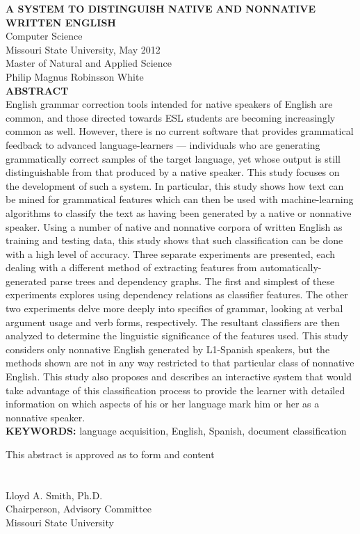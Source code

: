 \documentclass[main.tex]{subfiles}
\begin{document}
\noindent\textbf{A SYSTEM TO DISTINGUISH NATIVE AND NONNATIVE WRITTEN ENGLISH}\\
\noindent Computer Science\\
\noindent Missouri State University, May 2012\\
\noindent Master of Natural and Applied Science\\
\noindent Philip Magnus Robinsson White\\
\null
\noindent\textbf{ABSTRACT}\\
\singlespacing
\noindent English grammar correction tools intended for native speakers of English are common, and those directed towards ESL students are becoming increasingly common as well. However, there is no current software that provides grammatical feedback to advanced language-learners --- individuals who are generating grammatically correct samples of the target language, yet whose output is still distinguishable from that produced by a native speaker. This study focuses on the development of such a system. In particular, this study shows how text can be mined for grammatical features which can then be used with machine-learning algorithms to classify the text as having been generated by a native or nonnative speaker. Using a number of native and nonnative corpora of written English as training and testing data, this study shows that such classification can be done with a high level of accuracy. Three separate experiments are presented, each dealing with a different method of extracting features from automatically-generated parse trees and dependency graphs. The first and simplest of these experiments explores using dependency relations as classifier features. The other two experiments delve more deeply into specifics of grammar, looking at verbal argument usage and verb forms, respectively. The resultant classifiers are then analyzed to determine the linguistic significance of the features used. This study considers only nonnative English generated by L1-Spanish speakers, but the methods shown are not in any way restricted to that particular class of nonnative English. This study also proposes and describes an interactive system that would take advantage of this classification process to provide the learner with detailed information on which aspects of his or her language mark him or her as a nonnative speaker.\\
\null
\noindent \textbf{KEYWORDS:} language acquisition, English, Spanish, document classification\\
\null
\raggedleft
\begin{minipage}[b]{3.5in}
This abstract is approved as to form and content\\\\

\makebox[3.5in]{\hrulefill}\\
Lloyd A. Smith, Ph.D.\\
Chairperson, Advisory Committee\\
Missouri State University
\end{minipage}
\end{document}
